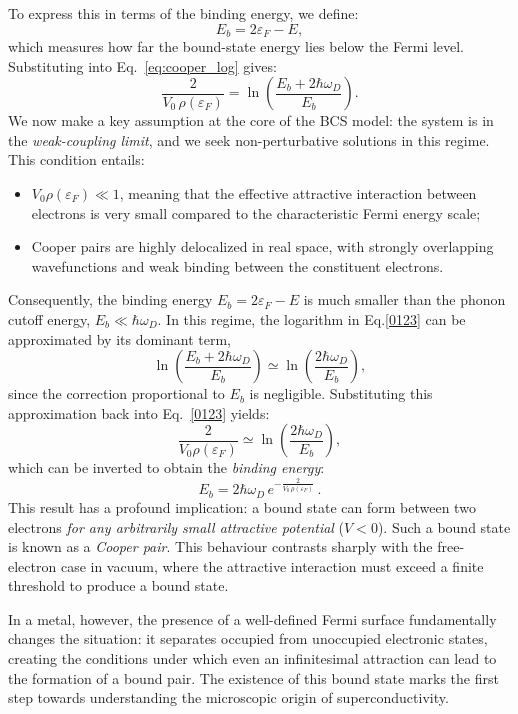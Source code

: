 To express this in terms of the binding energy, we define:
\[
E_b = 2\varepsilon_F - E,
\]
which measures how far the bound-state energy lies below the Fermi level.
Substituting into Eq.~\eqref{eq:cooper_log} gives:
\begin{equation}
\frac{2}{V_0\,\rho(\varepsilon_F)} =
\ln\!\left(\frac{E_b + 2\hbar\omega_D}{E_b}\right).
\label{0123}
\end{equation}
We now make a key assumption at the core of the BCS model: the system is in the \textit{weak-coupling limit}, and we seek non-perturbative solutions in this regime.  
This condition entails:
\begin{itemize}
    \item \(V_0 \rho(\varepsilon_F) \ll 1\), meaning that the effective attractive interaction between electrons is very small compared to the characteristic Fermi energy scale;
    \item Cooper pairs are highly delocalized in real space, with strongly overlapping wavefunctions and weak binding between the constituent electrons.
\end{itemize}
Consequently, the binding energy \(E_b = 2\varepsilon_F - E\) is much smaller than the phonon cutoff energy, \(E_b \ll \hbar\omega_D\).  
In this regime, the logarithm in Eq.\eqref{0123} can be approximated by its dominant term,
\[
\ln\!\left(\frac{E_b + 2\hbar\omega_D}{E_b}\right)
\simeq
\ln\!\left(\frac{2\hbar\omega_D}{E_b}\right),
\]
since the correction proportional to \(E_b\) is negligible. Substituting this approximation back into Eq.~\eqref{0123} yields:
\[
\frac{2}{V_0\rho(\varepsilon_F)}
\simeq
\ln\!\left(\frac{2\hbar\omega_D}{E_b}\right),
\]
which can be inverted to obtain the \emph{binding energy}:
\begin{equation}
\boxed{
E_b = 2\hbar\omega_D\,e^{-\tfrac{2}{V_0\, \rho(\varepsilon_F)}}}\, .
\label{eq:Eb_final}
\end{equation}
\noindent
This result has a profound implication: a bound state can form between two electrons
\emph{for any arbitrarily small attractive potential} (\(V < 0\)).
Such a bound state is known as a \emph{Cooper pair}.
This behaviour contrasts sharply with the free-electron case in vacuum,
where the attractive interaction must exceed a finite threshold to produce a bound state.

In a metal, however, the presence of a well-defined Fermi surface fundamentally changes the situation:
it separates occupied from unoccupied electronic states, creating the conditions under which
even an infinitesimal attraction can lead to the formation of a bound pair.
The existence of this bound state marks the first step towards understanding
the microscopic origin of superconductivity.



